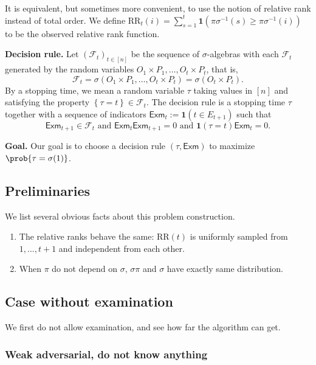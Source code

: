 It is equivalent, but sometimes more convenient, to use the notion of relative rank instead of total order. We define $\text{RR}_t(i)=\sum_{s=1}^t \mathbf{1}\left( \pi\sigma^{-1}(s)\ge \pi\sigma^{-1}(i) \right) $ to be the observed relative rank function.

\textbf{Decision rule.} Let $\left( \mathcal{F}_t \right)_{t \in [n]}$ be the sequence of $\sigma$-algebras with each $\mathcal{F}_t$ generated by the random variables $O_1 \times P_1, \ldots, O_t \times P_t$, that is, \[
\mathcal{F}_t = \sigma\left( O_1 \times P_1, \ldots, O_t \times P_t \right) =\sigma\left( O_t \times P_t \right) 
.\]  
By a stopping time, we mean a random variable $\tau$ taking values in $[n]$ and satisfying the property $\left\{ \tau=t  \right\} \in \mathcal{F}_t$. The decision rule is a stopping time $\tau$ together with a sequence of indicators $\textsf{Exm}_t :=\mathbf{1}(t \in E_{t+1})$ such that \[
	\textsf{Exm}_{t+1} \in \mathcal{F}_t \text{ and } \textsf{Exm}_{t}\textsf{Exm}_{t+1} = 0 \text{ and } \mathbf{1}\left( \tau = t  \right) \textsf{Exm}_t = 0
.\]

\textbf{Goal.} Our goal is to choose a decision rule $\left( \tau, \textsf{Exm} \right) $ to maximize $\prob{\tau=\sigma(1)}$.

\subsection{Preliminaries}

	We list several obvious facts about this problem construction.
\begin{lemma}
	\begin{enumerate}
		\item The relative ranks behave the same:  $\text{RR}(t)$ is uniformly sampled from $1, \ldots,t+1$ and independent from each other.
		\item When $\pi$ do not depend on $\sigma$, $\sigma \pi$ and $\sigma$ have exactly same distribution.
	\end{enumerate}
\end{lemma}

\subsection{Case without examination}

We first do not allow examination, and see how far the algorithm can get.

\subsubsection{Weak adversarial, do not know anything}

